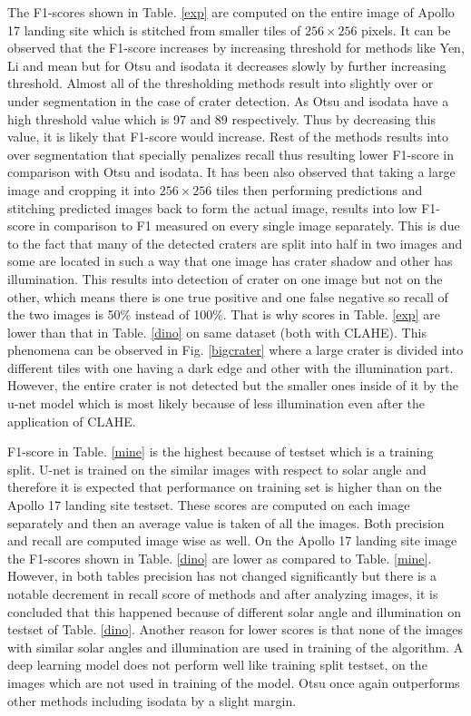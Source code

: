 \documentclass[11pt]{article}
\begin{document}
The F1-scores shown in Table. \ref{exp} are computed on the entire image of Apollo 17 landing site which is stitched from smaller tiles of $256 \times 256$ pixels. It can be observed that the F1-score increases by increasing threshold for methods like Yen, Li and mean but for Otsu and isodata it decreases slowly by further increasing threshold. Almost all of the thresholding methods result into slightly over or under segmentation in the case of crater detection. As Otsu and isodata have a high threshold value which is 97 and 89 respectively. Thus by decreasing this value, it is likely that F1-score would increase. Rest of the methods results into over segmentation that specially penalizes recall thus resulting lower F1-score in comparison with Otsu and isodata. It has been also observed that taking a large image and cropping it into $256 \times 256$ tiles then performing predictions and stitching predicted images back to form the actual image, results into low F1-score in comparison to F1 measured on every single image separately. This is due to the fact that many of the detected craters are split into half in two images and some are located in such a way that one image has crater shadow and other has illumination. This results into detection of crater on one image but not on the other, which means there is one true positive and one false negative so recall of the two images is 50\% instead of 100\%. That is why scores in Table. \ref{exp} are lower than that in Table. \ref{dino} on same dataset (both with CLAHE). This phenomena can be observed in Fig. \ref{bigcrater} where a large crater is divided into different tiles with one having a dark edge and other with the illumination part. However, the entire crater is not detected but the smaller ones inside of it by the u-net model which is most likely because of less illumination even after the application of CLAHE.

F1-score in Table. \ref{mine} is the highest because of testset which is a training split. U-net is trained on the similar images with respect to solar angle and therefore it is expected that performance on training set is higher than on the Apollo 17 landing site testset. These scores are computed on each image separately and then an average value is taken of all the images. Both precision and recall are computed image wise as well. On the Apollo 17 landing site image the F1-scores shown in Table. \ref{dino} are lower as compared to Table. \ref{mine}. However, in both tables precision has not changed significantly but there is a notable decrement in recall score of methods and after analyzing images, it is concluded that this happened because of different solar angle and illumination on testset of Table. \ref{dino}. Another reason for lower scores is that none of the images with similar solar angles and illumination are used in training of the algorithm. A deep learning model does not perform well like training split testset, on the images which are not used in training of the model. Otsu once again outperforms other methods including isodata by a slight margin.
\end{document}
